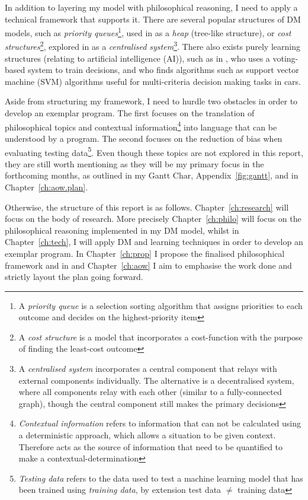 In addition to layering my model with philosophical reasoning, I need to apply a technical framework that supports it. There are several popular structures of DM models, such as \textit{priority queues}\footnote{A \textit{priority queue} is a selection sorting algorithm that assigns priorities to each outcome and decides on the highest-priority item}, used in \cite{islam2018algorithm} as a \textit{heap} (tree-like structure), or \textit{cost structures}\footnote{A \textit{cost structure} is a model that incorporates a cost-function with the purpose of finding the least-cost outcome}, explored in \cite{lee1999mathematical} as a \textit{centralised system}\footnote{A \textit{centralised system} incorporates a central component that relays with external components individually. The alternative is a decentralised system,  where all components relay with each other (similar to a fully-connected graph), though the central component still makes the primary decisions}. There also exists purely learning structures (relating to artificial intelligence (AI)), such as in \cite{noothigattu2017voting}, who uses a voting-based system to train decisions, and \cite{KARTAL2016599} who finds algorithms such as support vector machine (SVM) algorithms useful for multi-criteria decision making tasks in cars.

Aside from structuring my framework, I need to hurdle two obstacles in order to develop an exemplar program. The first focuses on the translation of philosophical topics and contextual information\footnote{\textit{Contextual information} refers to information that can not be calculated using a deterministic approach, which allows a situation to be given context. Therefore acts as the source of information that need to be quantified to make a contextual-determination} into language that can be understood by a program. The second focuses on the reduction of bias when evaluating testing data\footnote{\textit{Testing data} refers to the data used to test a machine learning model that has been trained using \textit{training data}, by extension test data $\neq$ training data}. Even though these topics are not explored in this report, they are still worth mentioning as they will be my primary focus in the forthcoming months, as outlined in my Gantt Char, Appendix~\ref{fig:gantt}, and in Chapter~\ref{ch:aow.plan}.

Otherwise, the structure of this report is as follows. Chapter~\ref{ch:research} will focus on the body of research. More precisely Chapter~\ref{ch:philo} will focus on the philosophical reasoning implemented in my DM model, whilst in Chapter~\ref{ch:tech}, I will apply DM and learning techniques in order to develop an exemplar program. In Chapter~\ref{ch:prop} I propose the finalised philosophical framework and in and Chapter~\ref{ch:aow} I aim to emphasise the work done and strictly layout the plan going forward.

